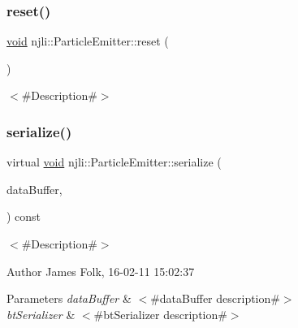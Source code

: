 \mbox{\label{classnjli_1_1_particle_emitter_aa4d2915815495c85fb349da5e33dd1a3}} 
\subsubsection{\texorpdfstring{reset()}{reset()}}
{\footnotesize\ttfamily \mbox{\hyperlink{_thread_8h_af1e856da2e658414cb2456cb6f7ebc66}{void}} njli\+::\+Particle\+Emitter\+::reset (\begin{DoxyParamCaption}{ }\end{DoxyParamCaption})}

$<$\#\+Description\#$>$ \mbox{\label{classnjli_1_1_particle_emitter_a041d9903cc7d37f572a3cf78c3d5120b}} 
\subsubsection{\texorpdfstring{serialize()}{serialize()}}
{\footnotesize\ttfamily virtual \mbox{\hyperlink{_thread_8h_af1e856da2e658414cb2456cb6f7ebc66}{void}} njli\+::\+Particle\+Emitter\+::serialize (\begin{DoxyParamCaption}\item[{\mbox{\hyperlink{_thread_8h_af1e856da2e658414cb2456cb6f7ebc66}{void}} $\ast$}]{data\+Buffer,  }\item[{bt\+Serializer $\ast$}]{ }\end{DoxyParamCaption}) const\hspace{0.3cm}{\ttfamily [virtual]}}



$<$\#\+Description\#$>$ 

\begin{DoxyAuthor}{Author}
James Folk, 16-\/02-\/11 15\+:02\+:37
\end{DoxyAuthor}

\begin{DoxyParams}{Parameters}
{\em data\+Buffer} & $<$\#data\+Buffer description\#$>$ \\
\hline
{\em bt\+Serializer} & $<$\#bt\+Serializer description\#$>$ \\
\hline
\end{DoxyParams}


